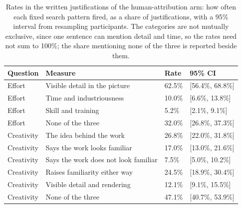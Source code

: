\begin{table}[!h]
\centering
\caption{\label{tab:supp_table_2}Rates in the written justifications of the human-attribution arm: how often each fixed search pattern fired, as a share of justifications, with a 95\% interval from resampling participants. The categories are not mutually exclusive, since one sentence can mention detail and time, so the rates need not sum to 100\%; the share mentioning none of the three is reported beside them.}
\centering
\fontsize{9}{11}\selectfont
\begin{tabular}[t]{llll}
\toprule
Question & Measure & Rate & 95\% CI\\
\midrule
Effort & Visible detail in the picture & 62.5\% & {}[56.4\%, 68.8\%]\\
Effort & Time and industriousness & 10.0\% & {}[6.6\%, 13.8\%]\\
Effort & Skill and training & 5.2\% & {}[2.1\%, 9.1\%]\\
Effort & None of the three & 32.0\% & {}[26.8\%, 37.3\%]\\
Creativity & The idea behind the work & 26.8\% & {}[22.0\%, 31.8\%]\\
\addlinespace
Creativity & Says the work looks familiar & 17.0\% & {}[13.0\%, 21.6\%]\\
Creativity & Says the work does not look familiar & 7.5\% & {}[5.0\%, 10.2\%]\\
Creativity & Raises familiarity either way & 24.5\% & {}[18.9\%, 30.4\%]\\
Creativity & Visible detail and rendering & 12.1\% & {}[9.1\%, 15.5\%]\\
Creativity & None of the three & 47.1\% & {}[40.7\%, 53.9\%]\\
\bottomrule
\end{tabular}
\end{table}